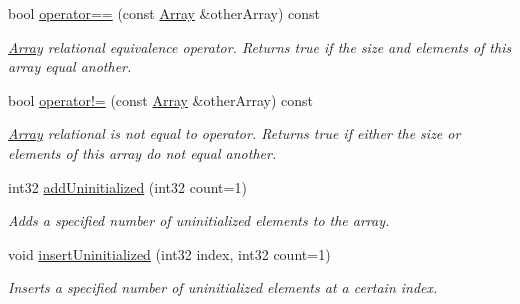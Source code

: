 \begin{DoxyCompactItemize}
\mbox{\label{class_arcana_1_1_array_a25d3ec6d16cc8185a35d9f97e699557a}} 
bool \mbox{\hyperlink{class_arcana_1_1_array_a25d3ec6d16cc8185a35d9f97e699557a}{operator==}} (const \mbox{\hyperlink{class_arcana_1_1_array}{Array}} \&other\+Array) const
\begin{DoxyCompactList}\small\item\em \mbox{\hyperlink{class_arcana_1_1_array}{Array}} relational equivalence operator. Returns true if the size and elements of this array equal another. \end{DoxyCompactList}\item 
\mbox{\label{class_arcana_1_1_array_abb9a88cdfaff6f1dea83c72bbbbf8514}} 
bool \mbox{\hyperlink{class_arcana_1_1_array_abb9a88cdfaff6f1dea83c72bbbbf8514}{operator!=}} (const \mbox{\hyperlink{class_arcana_1_1_array}{Array}} \&other\+Array) const
\begin{DoxyCompactList}\small\item\em \mbox{\hyperlink{class_arcana_1_1_array}{Array}} relational \textquotesingle{}is not equal to\textquotesingle{} operator. Returns true if either the size or elements of this array do not equal another. \end{DoxyCompactList}\item 
\mbox{\label{class_arcana_1_1_array_af31e33fbe2f51b9b322420eb4a43489a}} 
int32 \mbox{\hyperlink{class_arcana_1_1_array_af31e33fbe2f51b9b322420eb4a43489a}{add\+Uninitialized}} (int32 count=1)
\begin{DoxyCompactList}\small\item\em Adds a specified number of uninitialized elements to the array. \end{DoxyCompactList}\item 
\mbox{\label{class_arcana_1_1_array_ad8bd246353ed0bee4ef5a3a12796a029}} 
void \mbox{\hyperlink{class_arcana_1_1_array_ad8bd246353ed0bee4ef5a3a12796a029}{insert\+Uninitialized}} (int32 index, int32 count=1)
\begin{DoxyCompactList}\small\item\em Inserts a specified number of uninitialized elements at a certain index. \end{DoxyCompactList}\item 
\mbox{\label{class_arcana_1_1_array_a8b31d0e93b0681aefe579270d16b42ad}} 

\end{DoxyCompactItemize}
